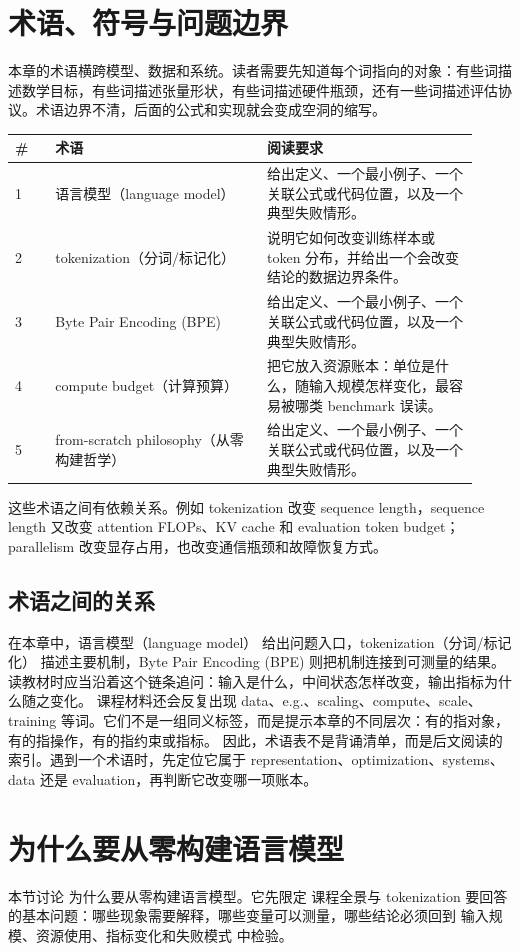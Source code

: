 \documentclass[a4paper]{article}
\begin{document}
\section{术语、符号与问题边界}
本章的术语横跨模型、数据和系统。读者需要先知道每个词指向的对象：有些词描述数学目标，有些词描述张量形状，有些词描述硬件瓶颈，还有一些词描述评估协议。术语边界不清，后面的公式和实现就会变成空洞的缩写。
\begin{longtable}{p{0.08\linewidth}p{0.42\linewidth}p{0.42\linewidth}}
\toprule
\textbf{\#} & \textbf{术语} & \textbf{阅读要求}\\
\midrule
1 & 语言模型（language model） & 给出定义、一个最小例子、一个关联公式或代码位置，以及一个典型失败情形。\\
2 & tokenization（分词/标记化） & 说明它如何改变训练样本或 token 分布，并给出一个会改变结论的数据边界条件。\\
3 & Byte Pair Encoding (BPE) & 给出定义、一个最小例子、一个关联公式或代码位置，以及一个典型失败情形。\\
4 & compute budget（计算预算） & 把它放入资源账本：单位是什么，随输入规模怎样变化，最容易被哪类 benchmark 误读。\\
5 & from-scratch philosophy（从零构建哲学） & 给出定义、一个最小例子、一个关联公式或代码位置，以及一个典型失败情形。\\
\bottomrule
\end{longtable}
这些术语之间有依赖关系。例如 tokenization 改变 sequence length，sequence length 又改变 attention FLOPs、KV cache 和 evaluation token budget；parallelism 改变显存占用，也改变通信瓶颈和故障恢复方式。
\subsection{术语之间的关系}
在本章中，语言模型（language model） 给出问题入口，tokenization（分词/标记化） 描述主要机制，Byte Pair Encoding (BPE) 则把机制连接到可测量的结果。读教材时应当沿着这个链条追问：输入是什么，中间状态怎样改变，输出指标为什么随之变化。
课程材料还会反复出现 data、e.g.、scaling、compute、scale、training 等词。它们不是一组同义标签，而是提示本章的不同层次：有的指对象，有的指操作，有的指约束或指标。
因此，术语表不是背诵清单，而是后文阅读的索引。遇到一个术语时，先定位它属于 representation、optimization、systems、data 还是 evaluation，再判断它改变哪一项账本。
\section{为什么要从零构建语言模型}
本节讨论 为什么要从零构建语言模型。它先限定 课程全景与 tokenization 要回答的基本问题：哪些现象需要解释，哪些变量可以测量，哪些结论必须回到 输入规模、资源使用、指标变化和失败模式 中检验。
\end{document}
